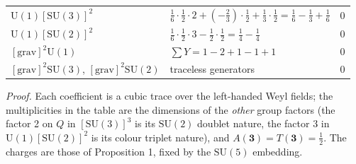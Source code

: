 \documentclass[aps,prd,amsmath,amssymb,superscriptaddress,longbibliography,floatfix,preprint]{revtex4-2}
\begin{document}
{\begin{longtable}{lll}
\arrayrulecolor{black!40}\hline\arrayrulecolor{black}
\parbox[c]{4.25cm}{\vspace{2.5pt}\raggedright {} \mbox{$\mathrm{U}(1)[\mathrm{SU}(3)]^2$}\vspace{2.5pt}} & \parbox[c]{9.39cm}{\vspace{2.5pt}\raggedright {} $\tfrac16\cdot\tfrac12\cdot 2 + (-\tfrac23)\cdot\tfrac12 + \tfrac13\cdot\tfrac12 = \tfrac16-\tfrac13+\tfrac16$\vspace{2.5pt}} & $0$ \\
\hline{}
\parbox[c]{4.25cm}{\vspace{2.5pt}\raggedright {} \mbox{$\mathrm{U}(1)[\mathrm{SU}(2)]^2$}\vspace{2.5pt}} & \parbox[c]{9.39cm}{\vspace{2.5pt}\raggedright {} $\tfrac16\cdot\tfrac12\cdot 3 - \tfrac12\cdot\tfrac12 = \tfrac14-\tfrac14$\vspace{2.5pt}} & $0$ \\
\hline{}
\parbox[c]{4.25cm}{\vspace{2.5pt}\raggedright {} \mbox{$[\mathrm{grav}]^2\mathrm{U}(1)$}\vspace{2.5pt}} & \parbox[c]{9.39cm}{\vspace{2.5pt}\raggedright {} $\sum Y = 1 - 2 + 1 - 1 + 1$\vspace{2.5pt}} & $0$ \\
\hline{}
\parbox[c]{4.25cm}{\vspace{2.5pt}\raggedright {} \mbox{$[\mathrm{grav}]^2\mathrm{SU}(3)$}, \mbox{$[\mathrm{grav}]^2\mathrm{SU}(2)$}\vspace{2.5pt}} & \parbox[c]{9.39cm}{\vspace{2.5pt}\raggedright {} traceless generators\vspace{2.5pt}} & $0$ \\
\end{longtable}
}

\emph{Proof.} Each coefficient is a cubic trace over the left-handed Weyl fields; the multiplicities in the table are the dimensions of the \emph{other} group factors (the factor 2 on $Q$ in $[\mathrm{SU}(3)]^3$ is its $\mathrm{SU}(2)$ doublet nature, the factor 3 in $\mathrm{U}(1)[\mathrm{SU}(2)]^2$ is its colour triplet nature), and $A(\mathbf 3) = T(\mathbf 3) = \tfrac12$. The charges are those of Proposition 1, fixed by the $\mathrm{SU}(5)$ embedding.
\end{document}
